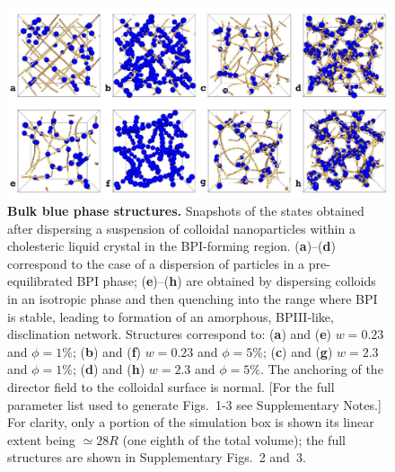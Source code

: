 \documentclass[12pt]{article}
\begin{document}
\begin{figure}

\centerline{\includegraphics[width=\textwidth]{text-fig1.jpg}}
\caption{\textbf{Bulk blue phase structures.} Snapshots of the states
obtained after dispersing
a suspension of colloidal nanoparticles within a cholesteric liquid
crystal in the BPI-forming region. (\textbf{a})--(\textbf{d}) correspond
to the case
of a dispersion of particles in a pre-equilibrated BPI phase;
(\textbf{e})--(\textbf{h}) are obtained by dispersing colloids in an isotropic
phase and then quenching into the range where BPI is stable, leading to
formation of an amorphous, BPIII-like, disclination network.
Structures correspond to:
(\textbf{a}) and (\textbf{e}) $w=0.23$ and $\phi=1\%$;
(\textbf{b}) and (\textbf{f}) $w=0.23$ and $\phi=5\%$; 
(\textbf{c}) and (\textbf{g}) $w=2.3$ and $\phi=1\%$;
(\textbf{d}) and (\textbf{h}) $w=2.3$ and $\phi=5\%$.
The anchoring of the director field to the colloidal surface is normal.
[For the full parameter list used to generate Figs.~1-3 see Supplementary
Notes.] For clarity, only a portion of the simulation box is shown
its linear extent being $\simeq 28R$
(one eighth of the total volume);
the full structures are shown in
Supplementary Figs.~2 and~3.}
\end{figure}
\end{document}
